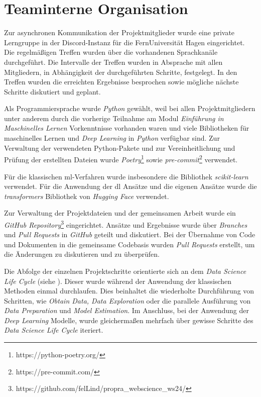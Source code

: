 \section{Teaminterne Organisation}

Zur asynchronen Kommunikation der Projektmitglieder wurde eine private Lerngruppe in der Discord-Instanz für die FernUniversität Hagen eingerichtet.
Die regelmäßigen Treffen wurden über die vorhandenen Sprachkanäle durchgeführt.
Die Intervalle der Treffen wurden in Absprache mit allen Mitgliedern, in Abhängigkeit der durchgeführten Schritte, festgelegt.
In den Treffen wurden die erreichten Ergebnisse besprochen sowie mögliche nächste Schritte diskutiert und geplant.

Als Programmiersprache wurde \textit{Python} gewählt, weil bei allen Projektmitgliedern unter anderem durch die vorherige Teilnahme am Modul \textit{Einführung in Maschinelles Lernen} Vorkenntnisse vorhanden waren und viele Bibliotheken für maschinelles Lernen und \textit{Deep Learning} in \textit{Python} verfügbar sind.
Zur Verwaltung der verwendeten Python-Pakete und zur Vereinheitlichung und Prüfung der erstellten Dateien wurde \textit{Poetry}\footnote{https://python-poetry.org/} sowie \textit{pre-commit}\footnote{https://pre-commit.com/} verwendet.

Für die klassischen \gls{ml}-Verfahren wurde insbesondere die Bibliothek \textit{scikit-learn} verwendet.
Für die Anwendung der \gls{dl} Ansätze und die eigenen Ansätze wurde die \textit{transformers} Bibliothek von \textit{Hugging Face} verwendet.

Zur Verwaltung der Projektdateien und der gemeinsamen Arbeit wurde ein \textit{GitHub Repository}\footnote{https://github.com/felLind/propra\_webscience\_ws24/} eingerichtet.
Ansätze und Ergebnisse wurde über \textit{Branches} und \textit{Pull Requests} in \textit{GitHub} geteilt und diskutiert.
Bei der Übernahme von Code und Dokumenten in die gemeinsame Codebasis wurden \textit{Pull Requests} erstellt, um die Änderungen zu diskutieren und zu überprüfen.

Die Abfolge der einzelnen Projektschritte orientierte sich an dem \textit{Data Science Life Cycle} (siehe \cite[Abb. 2]{Stodden2020}).
Dieser wurde während der Anwendung der klassischen Methoden einmal durchlaufen.
Dies beinhaltet die wiederholte Durchführung von Schritten, wie \textit{Obtain Data, Data Exploration} oder die parallele Ausführung von \textit{Data Preparation} und \textit{Model Estimation}.
Im Anschluss, bei der Anwendung der \textit{Deep Learning} Modelle, wurde gleichermaßen mehrfach über gewisse Schritte des \textit{Data Science Life Cycle} iteriert.
